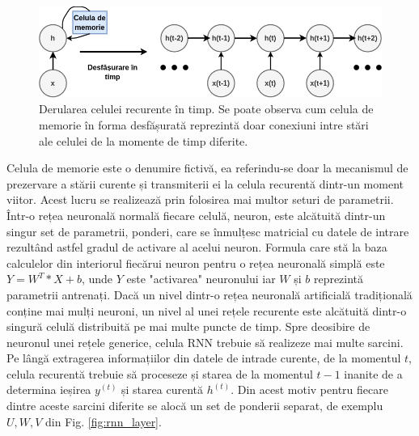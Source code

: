 \documentclass[a4paper,12pt]{book}
\begin{document}
				\begin{figure}[h]
					\centering
					\includegraphics[scale=0.55]{unfolding}
					\caption{Derularea celulei recurente în timp. Se poate observa cum celula de memorie în forma desfășurată  reprezintă doar conexiuni intre stări ale celulei de la momente de timp diferite.}
					\label{fig:unfolding}
				\end{figure}
				
				Celula de memorie este o denumire fictivă, ea referindu-se doar la mecanismul de prezervare a stării curente și transmiterii ei la celula recurentă dintr-un moment viitor. Acest lucru se realizează prin folosirea mai multor seturi de parametrii. Într-o rețea neuronală normală fiecare celulă, neuron, este alcătuită dintr-un singur set de parametrii, ponderi, care se înmulțesc matricial cu datele de intrare rezultând astfel gradul de activare al acelui neuron. Formula care stă la baza calculelor din interiorul fiecărui neuron pentru o rețea neuronală simplă  este $Y = W^T * X + b$, unde $Y$ este "activarea" neuronului iar $W$ și $b$  reprezintă parametrii antrenați. Dacă un nivel dintr-o rețea neuronală artificială tradițională conține mai mulți neuroni, un nivel al unei rețele recurente este alcătuită dintr-o singură celulă distribuită pe mai multe puncte de timp. Spre deosibire de neuronul unei rețele generice, celula RNN trebuie să realizeze mai multe sarcini. Pe lângă extragerea informațiilor din datele de intrade curente, de la momentul $t$, celula recurentă trebuie să proceseze și starea de la momentul $t-1$ inanite de a determina ieșirea $y^{(t)}$ și starea curentă $h^{(t)}$. Din acest motiv pentru fiecare dintre aceste sarcini diferite se alocă un set de ponderii separat, de exemplu $U, W, V$ din Fig. \ref{fig:rnn_layer}.
				
\end{document}
